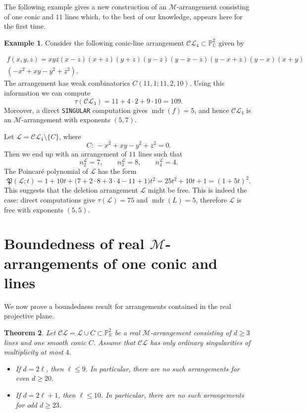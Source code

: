 \documentclass[11pt]{article}
\theoremstyle{plain}
\newtheorem{theorem}{Theorem}[section]
\theoremstyle{definition}
\newtheorem{example}[theorem]{Example}
\theoremstyle{remark}
\begin{document}
The following example gives a new construction of an \(\mathscr{M}\)-arrangement consisting of one conic and \(11\) lines which, to the best of our knowledge, appears here for the first time.
\begin{example}
\label{new}
Consider the following conic-line arrangement $\mathcal{CL}_4 \subset \mathbb P^2_{\mathbb C}$
given by

\begin{multline*}
f(x,y,z)={}
xyz(x-z)(x+z)(y+z)(y-z)(y-x-z)(y-x+z)(y-x)(x+y)\\
(-x^2+xy-y^2+z^2).
\end{multline*}
The arrangement has weak combinatorics $C(11,1;11,2,10)$. Using this information we can compute
\[
\tau(\mathcal{CL}_4)=11+4\cdot 2+9\cdot 10=109.
\]
Moreover, a direct \texttt{SINGULAR} computation gives $\operatorname{mdr}(f)=5$, and hence $\mathcal{CL}_4$
is an $\mathscr{M}$-arrangement with exponents $(5,7)$.

Let $\mathcal{L}=\mathcal{CL}_4\setminus\{C\}$, where
\[
C:\ -x^2+xy-y^2+z^2=0.
\]
Then we end up with an arrangement of $11$ lines such that
\[
n_2^{\mathcal{L}}=7,\qquad n_3^{\mathcal{L}}=8,\qquad n_4^{\mathcal{L}}=4.
\]
The Poincar\'e polynomial of $\mathcal{L}$ has the form
\[
\mathfrak{P}(\mathcal{L};t)
=
1+10t+\bigl(7+2\cdot 8+3\cdot 4-11+1\bigr)t^2
=
25t^2+10t+1
=
(1+5t)^2.
\]
This suggests that the deletion arrangement $\mathcal{L}$ might be free. This is indeed the case: direct computations give $\tau(\mathcal{L})=75$ and $\operatorname{mdr}(L)=5$, therefore $\mathcal{L}$ is free with
exponents $(5,5)$.
\end{example}
\section[Boundedness of real M-arrangements of one conic and lines]{Boundedness of real $\mathscr{M}$-arrangements of one conic and lines}
We now prove a boundedness result for arrangements contained in the real projective plane.
\begin{theorem}
Let $\mathcal{CL}= \mathcal{L}\cup C\subset \mathbb P^2_{\mathbb R}$ be a real $\mathscr{M}$-arrangement
consisting of $d\geq 3$ lines and one smooth conic $C$. Assume that $\mathcal{CL}$ has only
ordinary singularities of multiplicity at most $4$. 
\begin{itemize}
    \item If $d=2\ell$, then $\ell\leq 9$. In particular, there are no such arrangements
    for even $d\geq 20$.
    \item If $d=2\ell+1$, then $\ell\leq 10$. In particular, there are no such arrangements
    for odd $d\geq 23$.
\end{itemize}
\end{theorem}
\end{document}
